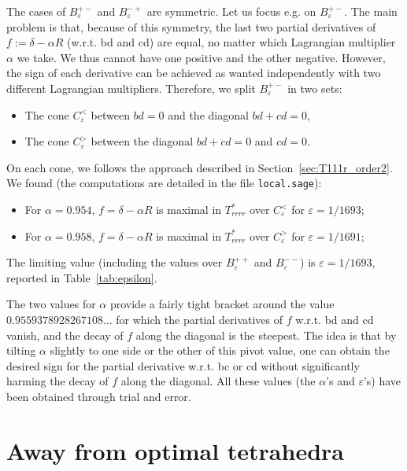 \documentclass[11pt]{article}
\begin{document}
The cases of $B^{+-}_\varepsilon$ and $B^{-+}_\varepsilon$ are symmetric.
Let us focus e.g. on $B^{+-}_\varepsilon$.
The main problem is that, because of this symmetry, the last two partial derivatives of $f:=\delta-\alpha R$ (w.r.t. bd and cd) are equal, no matter which Lagrangian multiplier $\alpha$ we take.
We thus cannot have one positive and the other negative.
However, the sign of each derivative can be achieved as wanted independently with two different Lagrangian multipliers.
Therefore, we split $B^{+-}_\varepsilon$ in two sets:
\begin{itemize}
\item The cone $C_\varepsilon^<$ between $bd=0$ and the diagonal $bd+cd=0$,
\item The cone $C_\varepsilon^>$ between the diagonal $bd+cd=0$ and $cd=0$.
\end{itemize}
On each cone, we follows the approach described in Section~\ref{sec:T111r_order2}.
We found (the computations are detailed in the file \verb+local.sage+):
\begin{itemize}
\item
For $\alpha=0.954$, $f=\delta-\alpha R$ is maximal in $T_{rrrr}^*$ over $C_\varepsilon^<$ for $\varepsilon=1/1693$;
\item
For $\alpha=0.958$, $f=\delta-\alpha R$ is maximal in $T_{rrrr}^*$ over $C_\varepsilon^>$ for $\varepsilon=1/1691$;
\end{itemize}
The limiting value (including the values over $B_\varepsilon^{++}$ and $B_\varepsilon^{--}$) is $\varepsilon=1/1693$, reported in Table~\ref{tab:epsilon}.

The two values for $\alpha$ provide a fairly tight bracket around the value $0.9559378928267108\ldots$ for which the partial derivatives of $f$ w.r.t. bd and cd vanish, and the decay of $f$ along the diagonal is the steepest.
The idea is that by tilting $\alpha$ slightly to one side or the other of this pivot value, one can obtain the desired sign for the partial derivative w.r.t. bc or cd without significantly harming the decay of $f$ along the diagonal.
All these values (the $\alpha$'s and $\varepsilon$'s) have been obtained through trial and error.


\section{Away from optimal tetrahedra}
\label{sec:dim_reduc}
\end{document}
